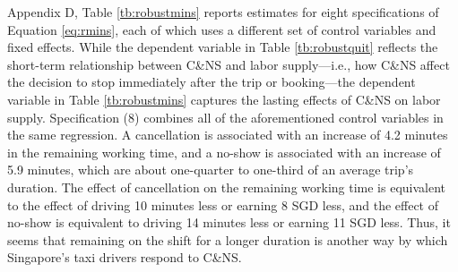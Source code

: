 \documentclass[reviewmode]{restat}
\begin{document}

Appendix D, Table \ref{tb:robustmins} reports estimates for eight specifications of Equation \eqref{eq:rmins},
each of which uses a different set of control variables and fixed effects. While the dependent variable
in Table \ref{tb:robustquit} reflects the short-term relationship between C\&NS and labor supply---i.e., 
how C\&NS affect the decision to stop immediately after the trip or booking---the dependent variable
in Table \ref{tb:robustmins} captures the lasting effects of C\&NS on labor supply. %
Specification (8) combines all of the aforementioned  control variables in the same regression. 
A cancellation is associated with an increase of 4.2 minutes in the remaining working time, and a no-show
is associated with an increase of 5.9 minutes, which are about one-quarter to one-third of an average 
trip's duration. The effect of cancellation on the remaining working time is equivalent to the effect of
driving 10 minutes less or earning 8 SGD less, and the effect of no-show is equivalent to driving 14 minutes
less or earning 11 SGD less. 
 Thus, it seems that remaining on the shift for a longer duration is another way by which Singapore's taxi 
 drivers respond to C\&NS.
\end{document}
